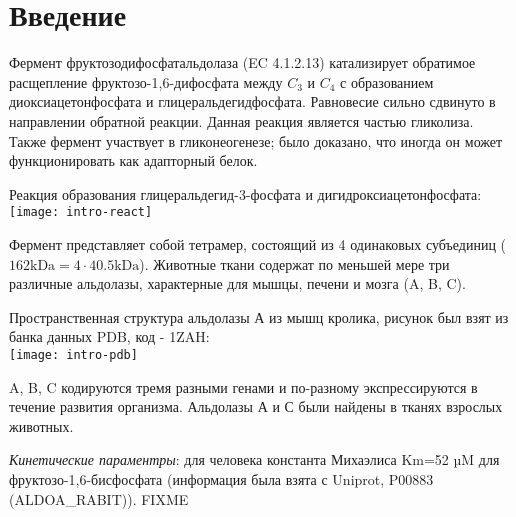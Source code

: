 \section{Введение}
Фермент фруктозодифосфатальдолаза (EC 4.1.2.13) катализирует обратимое расщепление
фруктозо-1,6-дифосфата между $C_3$ и $C_4$ с образованием диоксиацетонфосфата и глицеральдегидфосфата.
Равновесие сильно сдвинуто в направлении обратной реакции.
Данная реакция является частью гликолиза. Также фермент участвует в гликонеогенезе;
было доказано, что иногда он может функционировать как адапторный белок.

Реакция образования глицеральдегид-3-фосфата и дигидроксиацетонфосфата:\\
\texttt{[image: intro-react]}

Фермент представляет собой тетрамер, состоящий из 4 одинаковых субъединиц
($ 162 \text{kDa} = 4 \cdot 40.5 \text{kDa} $).
Животные ткани содержат по меньшей мере три различные альдолазы, характерные для
мышцы, печени и мозга (A, B, C).

Пространственная структура альдолазы А из мышц кролика, рисунок был взят из банка данных PDB, код - 1ZAH:\\
\texttt{[image: intro-pdb]}

A, B, C кодируются тремя разными генами и по-разному экспрессируются в течение развития организма.
Альдолазы А и С были найдены в тканях взрослых животных.

\emph{Кинетические параментры}: для человека константа Михаэлиса Km=52 µM для фруктозо-1,6-бисфосфата
(информация была взята с Uniprot, P00883 (ALDOA\_RABIT)). FIXME

